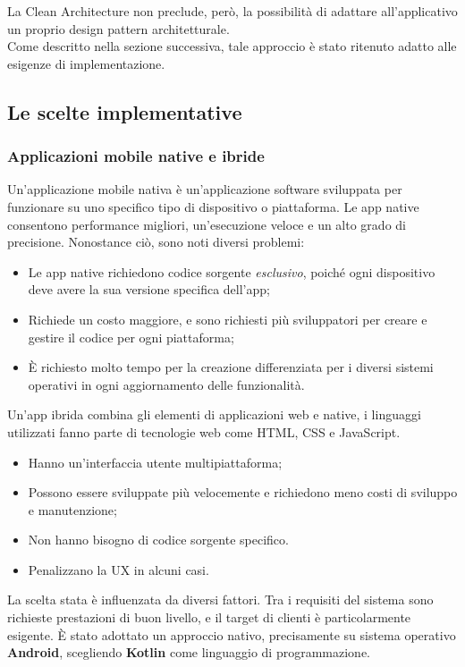 \documentclass{natourDoc}
\begin{document}
La Clean Architecture non preclude, però, la possibilità di adattare all'applicativo un proprio design pattern architetturale. \\
Come descritto nella sezione successiva, tale approccio è stato ritenuto adatto alle esigenze di implementazione.

\newpage

\subsection{Le scelte implementative}
\subsubsection{Applicazioni mobile native e ibride}
Un’applicazione mobile nativa è un’applicazione software sviluppata per funzionare su uno specifico tipo di dispositivo o piattaforma.
Le app native consentono performance migliori, un’esecuzione veloce e un alto grado di precisione. Nonostance ciò, sono noti diversi problemi:
\begin{itemize}
	\item Le app native richiedono codice sorgente \textit{esclusivo}, poiché ogni dispositivo deve avere la sua versione specifica dell’app;
	\item Richiede un costo maggiore, e sono richiesti più sviluppatori per creare e gestire il codice per ogni piattaforma;
	\item È richiesto molto tempo per la creazione differenziata per i diversi sistemi operativi in ogni aggiornamento delle funzionalità.
\end{itemize}

Un’app ibrida combina gli elementi di applicazioni web e native, i linguaggi utilizzati fanno parte di tecnologie web come HTML, CSS e JavaScript.
\begin{itemize}
	\item Hanno un’interfaccia utente multipiattaforma;
	\item Possono essere sviluppate più velocemente e richiedono meno costi di sviluppo e manutenzione;
	\item Non hanno bisogno di codice sorgente specifico.
	\item Penalizzano la UX in alcuni casi.
\end{itemize}

La scelta stata è influenzata da diversi fattori. Tra i requisiti del sistema sono richieste prestazioni di buon livello, e il target
di clienti è particolarmente esigente.
È stato adottato un approccio nativo, precisamente su sistema operativo \textbf{Android}, scegliendo \textbf{Kotlin} come linguaggio di programmazione.
\end{document}
